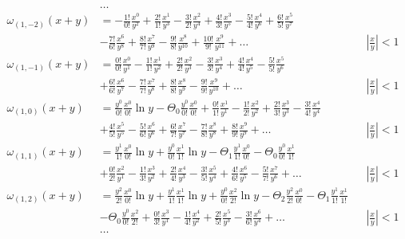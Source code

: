 \begin{equation*} \begin{aligned}
&\ldots \\
%
\omega_{(1,-2)}(x + y) &= 
- \frac{1!}{0!} \frac{x^0}{y^2}
+ \frac{2!}{1!} \frac{x^1}{y^3}
- \frac{3!}{2!} \frac{x^2}{y^4}
+ \frac{4!}{3!} \frac{x^3}{y^5}
- \frac{5!}{4!} \frac{x^4}{y^6}
+ \frac{6!}{5!} \frac{x^5}{y^7} \\ &
- \frac{7!}{6!} \frac{x^6}{y^8}
+ \frac{8!}{7!} \frac{x^7}{y^9}
- \frac{9!}{8!} \frac{x^8}{y^{10}}
+ \frac{10!}{9!} \frac{x^9}{y^{11}}
+ \ldots & 
&\left| \frac{x}{y} \right| < 1 \\
%
\omega_{(1,-1)}(x + y) &=  
  \frac{0!}{0!} \frac{x^0}{y^1}
- \frac{1!}{1!} \frac{x^1}{y^2}
+ \frac{2!}{2!} \frac{x^2}{y^3}
- \frac{3!}{3!} \frac{x^3}{y^4}
+ \frac{4!}{4!} \frac{x^4}{y^5}
- \frac{5!}{5!} \frac{x^5}{y^6} \\ &
+ \frac{6!}{6!} \frac{x^6}{y^7}
- \frac{7!}{7!} \frac{x^7}{y^8}
+ \frac{8!}{8!} \frac{x^8}{y^9}
- \frac{9!}{9!} \frac{x^9}{y^{10}}
+ \ldots & 
&\left| \frac{x}{y} \right| < 1 \\
%
\omega_{(1,0)}(x + y) &=
  \frac{y^0}{0!} \frac{x^0}{0!} \ln{y}
- \Theta_0 \frac{y^0}{0!} \frac{x^0}{0!}
+ \frac{0!}{1!} \frac{x^1}{y^1} 
- \frac{1!}{2!} \frac{x^2}{y^2}
+ \frac{2!}{3!} \frac{x^3}{y^3}
- \frac{3!}{4!} \frac{x^4}{y^4} \\ &
+ \frac{4!}{5!} \frac{x^5}{y^5}
- \frac{5!}{6!} \frac{x^6}{y^6}
+ \frac{6!}{7!} \frac{x^7}{y^7}
- \frac{7!}{8!} \frac{x^8}{y^8}
+ \frac{8!}{9!} \frac{x^9}{y^9}
+ \ldots & 
&\left| \frac{x}{y} \right| < 1 \\
%
\omega_{(1,1)}(x + y) &=
  \frac{y^1}{1!} \frac{x^0}{0!} \ln{y}
+ \frac{y^0}{0!} \frac{x^1}{1!} \ln{y}
- \Theta_1 \frac{y^1}{1!} \frac{x^0}{0!}
- \Theta_0 \frac{y^0}{0!} \frac{x^1}{1!} \\ &
+ \frac{0!}{2!} \frac{x^2}{y^1}
- \frac{1!}{3!} \frac{x^3}{y^2}
+ \frac{2!}{4!} \frac{x^4}{y^3}
- \frac{3!}{5!} \frac{x^5}{y^4}
+ \frac{4!}{6!} \frac{x^6}{y^5}
- \frac{5!}{7!} \frac{x^7}{y^6}
+ \ldots & 
&\left| \frac{x}{y} \right| < 1 \\
%
\omega_{(1,2)}(x + y) &= 
  \frac{y^2}{2!} \frac{x^0}{0!} \ln{y}
+ \frac{y^1}{1!} \frac{x^1}{1!} \ln{y}
+ \frac{y^0}{0!} \frac{x^2}{2!} \ln{y}
- \Theta_2 \frac{y^2}{2!} \frac{x^0}{0!}
- \Theta_1 \frac{y^1}{1!} \frac{x^1}{1!} \\ &
- \Theta_0 \frac{y^0}{0!} \frac{x^2}{2!}
+ \frac{0!}{3!} \frac{x^3}{y^1}
- \frac{1!}{4!} \frac{x^4}{y^2}
+ \frac{2!}{5!} \frac{x^5}{y^3}
- \frac{3!}{6!} \frac{x^6}{y^4}
+ \ldots & 
&\left| \frac{x}{y} \right| < 1 \\
%
&\ldots \\
\end{aligned} \end{equation*}
